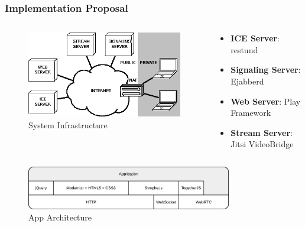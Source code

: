 \documentclass[t]{beamer}
\begin{document}
		\begin{frame}[c]
		\frametitle{Implementation Proposal}


\begin{columns}[c]
\begin{column}{.4\textwidth}
		\begin{figure}[H]
			\includegraphics[width=\textwidth]{figures/arch.png}
			\caption{System Infrastructure}
		\end{figure}
\end{column}
\begin{column}{.6\textwidth}

\begin{itemize}
\small
		\item \textbf{ICE Server}: restund
		\vfill
		\item \textbf{Signaling Server}: Ejabberd
		\vfill
		\item \textbf{Web Server}: Play Framework
		\vfill
		\item \textbf{Stream Server}: Jitsi VideoBridge
		\end{itemize}

\end{column}
\end{columns}



{
		\centering
		\begin{figure}[H]
			\includegraphics[width=0.8\textwidth]{figures/apparch.png}
			\caption{App Architecture}
		\end{figure}
}

		\end{frame}
\end{document}
